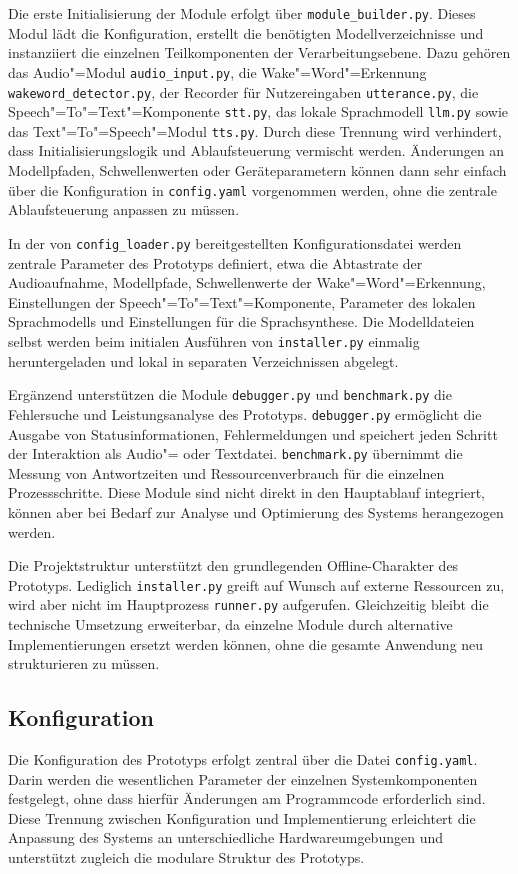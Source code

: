 Die erste Initialisierung der Module erfolgt über \texttt{module\_builder.py}. Dieses Modul lädt die Konfiguration, erstellt die benötigten Modellverzeichnisse und instanziiert die einzelnen Teilkomponenten der Verarbeitungsebene. Dazu gehören das Audio"=Modul \texttt{audio\_input.py}, die Wake"=Word"=Erkennung \texttt{wakeword\_detector.py}, der Recorder für Nutzereingaben \texttt{utterance.py}, die Speech"=To"=Text"=Komponente \texttt{stt.py}, das lokale Sprachmodell \texttt{llm.py} sowie das Text"=To"=Speech"=Modul \texttt{tts.py}. Durch diese Trennung wird verhindert, dass Initialisierungslogik und Ablaufsteuerung vermischt werden. Änderungen an Modellpfaden, Schwellenwerten oder Geräteparametern können dann sehr einfach über die Konfiguration in \texttt{config.yaml} vorgenommen werden, ohne die zentrale Ablaufsteuerung anpassen zu müssen.

In der von \texttt{config\_loader.py} bereitgestellten Konfigurationsdatei werden zentrale Parameter des Prototyps definiert, etwa die Abtastrate der Audioaufnahme, Modellpfade, Schwellenwerte der Wake"=Word"=Erkennung, Einstellungen der Speech"=To"=Text"=Komponente, Parameter des lokalen Sprachmodells und Einstellungen für die Sprachsynthese. Die Modelldateien selbst werden beim initialen Ausführen von \texttt{installer.py} einmalig heruntergeladen und lokal in separaten Verzeichnissen abgelegt.

Ergänzend unterstützen die Module \texttt{debugger.py} und \texttt{benchmark.py} die Fehlersuche und Leistungsanalyse des Prototyps. \texttt{debugger.py} ermöglicht die Ausgabe von Statusinformationen, Fehlermeldungen und speichert jeden Schritt der Interaktion als Audio"= oder Textdatei. \texttt{benchmark.py} übernimmt die Messung von Antwortzeiten und Ressourcenverbrauch für die einzelnen Prozessschritte. Diese Module sind nicht direkt in den Hauptablauf integriert, können aber bei Bedarf zur Analyse und Optimierung des Systems herangezogen werden.

Die Projektstruktur unterstützt den grundlegenden Offline-Charakter des Prototyps. Lediglich \texttt{installer.py} greift auf Wunsch auf externe Ressourcen zu, wird aber nicht im Hauptprozess \texttt{runner.py} aufgerufen. Gleichzeitig bleibt die technische Umsetzung erweiterbar, da einzelne Module durch alternative Implementierungen ersetzt werden können, ohne die gesamte Anwendung neu strukturieren zu müssen.


\subsection{Konfiguration}
\label{subsec:Konfiguration}
Die Konfiguration des Prototyps erfolgt zentral über die Datei \texttt{config.yaml}. Darin werden die wesentlichen Parameter der einzelnen Systemkomponenten festgelegt, ohne dass hierfür Änderungen am Programmcode erforderlich sind. Diese Trennung zwischen Konfiguration und Implementierung erleichtert die Anpassung des Systems an unterschiedliche Hardwareumgebungen und unterstützt zugleich die modulare Struktur des Prototyps.

